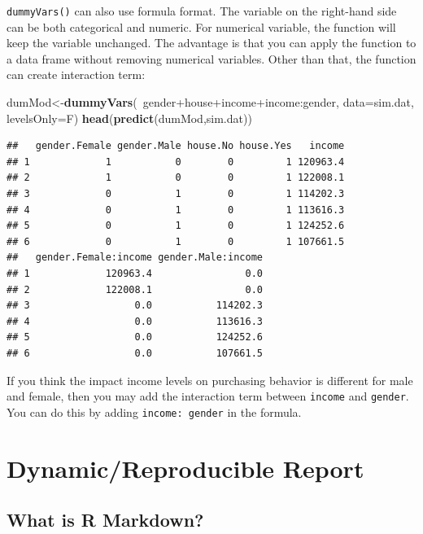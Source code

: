 \documentclass[]{book}
\newenvironment{Shaded}{\begin{snugshade}}{\end{snugshade}}
\newcommand{\KeywordTok}[1]{\textcolor[rgb]{0.13,0.29,0.53}{\textbf{{#1}}}}
\newcommand{\DataTypeTok}[1]{\textcolor[rgb]{0.13,0.29,0.53}{{#1}}}
\newcommand{\NormalTok}[1]{{#1}}
\theoremstyle{definition}
\theoremstyle{definition}
\theoremstyle{remark}
\begin{document}
\texttt{dummyVars()} can also use formula format. The variable on the
right-hand side can be both categorical and numeric. For numerical
variable, the function will keep the variable unchanged. The advantage
is that you can apply the function to a data frame without removing
numerical variables. Other than that, the function can create
interaction term:

\begin{Shaded}
\begin{Highlighting}[]
\NormalTok{dumMod<-}\KeywordTok{dummyVars}\NormalTok{(~gender+house+income+income:gender,}
                  \DataTypeTok{data=}\NormalTok{sim.dat,}
                  \DataTypeTok{levelsOnly=}\NormalTok{F)}
\KeywordTok{head}\NormalTok{(}\KeywordTok{predict}\NormalTok{(dumMod,sim.dat))}
\end{Highlighting}
\end{Shaded}

\begin{verbatim}
##   gender.Female gender.Male house.No house.Yes   income
## 1             1           0        0         1 120963.4
## 2             1           0        0         1 122008.1
## 3             0           1        0         1 114202.3
## 4             0           1        0         1 113616.3
## 5             0           1        0         1 124252.6
## 6             0           1        0         1 107661.5
##   gender.Female:income gender.Male:income
## 1             120963.4                0.0
## 2             122008.1                0.0
## 3                  0.0           114202.3
## 4                  0.0           113616.3
## 5                  0.0           124252.6
## 6                  0.0           107661.5
\end{verbatim}

If you think the impact income levels on purchasing behavior is
different for male and female, then you may add the interaction term
between \texttt{income} and \texttt{gender}. You can do this by adding
\texttt{income:\ gender} in the formula.

\chapter{Dynamic/Reproducible Report}\label{dynamicreproducible-report}

\section{What is R Markdown?}\label{what-is-r-markdown}
\end{document}
